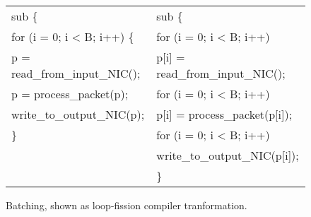 \begin{figure}[ht]
\begin{small}
\begin{tabular}[b]{l|l}
sub\hspace{0.2cm}{\bf app} \{ &  sub\hspace{0.2cm}{\bf app} \{\\
\hspace{0.3cm}for (i = 0; i < B; i++) \{ &\hspace{0.3cm}for (i = 0; i < B; i++)\\
\hspace{0.6cm}p = read\_from\_input\_NIC(); &\hspace{0.6cm}p[i] = read\_from\_input\_NIC();\\
\hspace{0.6cm}p = process\_packet(p); & \hspace{0.3cm}for (i = 0; i < B; i++)\\
\hspace{0.6cm}write\_to\_output\_NIC(p); & \hspace{0.6cm}p[i] = process\_packet(p[i]);\\
\hspace{0.3cm}\} &\hspace{0.3cm}for (i = 0; i < B; i++)\\
&\hspace{0.6cm}write\_to\_output\_NIC(p[i]);\\
&\}\\
\end{tabular}
\end{small}
\caption{\label{fig:loop_fission_batch} Batching, shown as loop-fission compiler tranformation.}
\end{figure}

